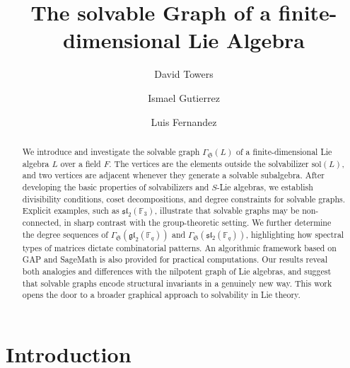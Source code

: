\documentclass[11pt]{amsart}
\title[The solvable Graph]{The solvable Graph of a finite-dimensional Lie Algebra}
\author{David Towers}
\author{Ismael Gutierrez}
\author{Luis Fernandez}
\theoremstyle{plain}
\def\F{\mathbb{F}}
\def\sol{\mathrm{sol}}
\begin{document}
 


\begin{abstract}
We introduce and investigate the solvable graph $\Gamma_\mathfrak{S}(L)$ of a finite-dimensional Lie algebra $L$ over a field $F$. The vertices are the elements outside the solvabilizer $\sol(L)$, and two vertices are adjacent whenever they generate a solvable subalgebra. After developing the basic properties of solvabilizers and $S$-Lie algebras, we establish divisibility conditions, coset decompositions, and degree constraints for solvable graphs. Explicit examples, such as $\mathfrak{sl}_2(\mathbb{F}_3)$, illustrate that solvable graphs may be non-connected, in sharp contrast with the group-theoretic setting. We further determine the degree sequences of $\Gamma_\mathfrak{S}(\mathfrak{gl}_2(\F_q))$ and $\Gamma_\mathfrak{S}(\mathfrak{sl}_2(\F_q))$, highlighting how spectral types of matrices dictate combinatorial patterns. An algorithmic framework based on GAP and SageMath is also provided for practical computations. Our results reveal both analogies and differences with the nilpotent graph of Lie algebras, and suggest that solvable graphs encode structural invariants in a genuinely new way. This work opens the door to a broader graphical approach to solvability in Lie theory.


\end{abstract}


\maketitle

 
 



\section{Introduction}
\end{document}
